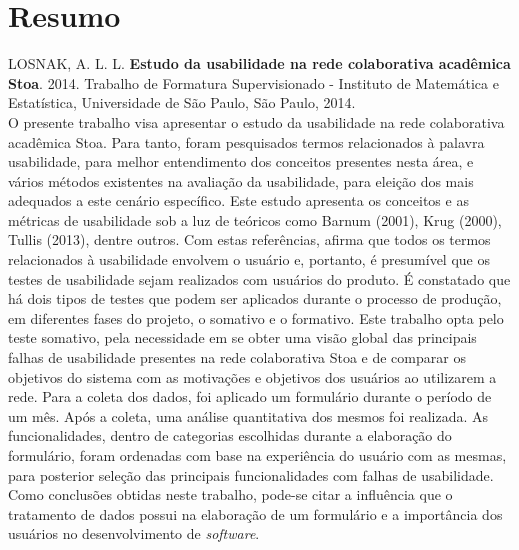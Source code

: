 \documentclass[11pt,twoside,a4paper]{book}
\begin{document}
\chapter*{Resumo}

\noindent LOSNAK, A. L. L. \textbf{Estudo da usabilidade na rede colaborativa acadêmica Stoa}. 
2014.
Trabalho de Formatura Supervisionado - Instituto de Matemática e Estatística,
Universidade de São Paulo, São Paulo, 2014.
\\

O presente trabalho visa apresentar o estudo da usabilidade na rede colaborativa acadêmica Stoa. Para tanto, foram pesquisados
termos relacionados à palavra usabilidade, para melhor entendimento dos conceitos presentes nesta área, e vários métodos 
existentes na avaliação da usabilidade, para eleição dos mais adequados a este cenário específico. 
Este estudo apresenta os conceitos e as métricas de usabilidade sob a luz de teóricos como Barnum (2001), Krug (2000), 
Tullis (2013), dentre outros. Com estas referências, afirma que todos os termos relacionados à usabilidade envolvem o usuário
e, portanto, é presumível que os testes de usabilidade sejam realizados com usuários do produto. 
É constatado que há dois tipos de testes que podem ser aplicados durante o processo de produção, em diferentes fases do 
projeto, o somativo e o formativo. Este trabalho opta pelo teste somativo, pela necessidade em se obter uma visão global das
principais falhas de usabilidade presentes na rede colaborativa Stoa e de comparar os objetivos do sistema com as motivações
e objetivos dos usuários ao utilizarem a rede. 
Para a coleta dos dados, foi aplicado um formulário durante o período de um mês. Após a coleta, uma análise quantitativa dos
mesmos foi realizada. As funcionalidades, dentro de categorias escolhidas durante a elaboração do formulário, foram ordenadas
com base na experiência do usuário com as mesmas, para posterior seleção das principais funcionalidades com falhas de 
usabilidade. Como conclusões obtidas neste trabalho, pode-se citar a influência que o tratamento de dados possui na elaboração de um formulário e a importância dos usuários no desenvolvimento de \emph{software}.
\\
\end{document}
